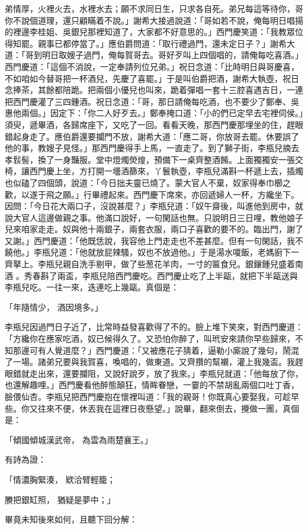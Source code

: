 \begin{showcontents}{}
弟情厚，火裡火去，水裡水去；願不求同日生，只求各自死。弟兄每這等待你，哥你不說個道理，還只顧瞞着不說。」謝希大接過說道：「哥如若不說，俺每明日唱揚的裡邊李桂姐、吳銀兒那裡知道了，大家都不好意思的。」西門慶笑道：「我教眾位得知罷。親事已都停當了。」應伯爵問道：「取行禮過門，還未定日子？」謝希大道：「哥到明日取嫂子過門，俺每賀哥去。哥好歹叫上四個唱的，請俺每吃喜酒。」西門慶道：「這個不消說，一定奉請列位兄弟。」祝日念道：「比時明日與哥慶喜，不如咱如今替哥把一杯酒兒，先慶了喜罷。」于是叫伯爵把酒，謝希大執壺，祝日念捧茶，其餘都陪跪。把兩個小優兒也叫來，跪着彈唱一套十三腔喜遇吉日，一連把西門慶灌了三四鍾酒。祝日念道：「哥，那日請俺每吃酒，也不要少了鄭奉、吳惠他兩個。」因定下：「你二人好歹去。」鄭奉掩口道：「小的們已定早去宅裡伺侯。」須臾，遞畢酒，各歸席座下，又吃了一回。看看天晚，那西門慶那埋坐的住，趕眼錯起身走了。應伯爵還要攔門不放，謝希大道：「應二哥，你放哥去罷。休要誤了他的事，教嫂子見怪。」那西門慶得手上馬，一直走了。到了獅子街，李瓶兒摘去孝䯼髻，換了一身豔服。堂中燈燭熒煌，預備下一桌齊整酒餚。上面獨獨安一張交椅，讓西門慶上坐，方打開一壜酒篩來，丫鬟執壺，李瓶兒滿斟一杯遞上去，插燭也似磕了四個頭，說道：「今日拙夫靈已燒了。蒙大官人不棄，奴家得奉巾櫛之歡，以遂于飛之願。」行畢禮起來。西門慶下席來，亦回遞婦人一杯，方纔坐下。因問：「今日花大兩口子，沒說甚麼？」李瓶兒道：「奴午齋後，叫進他到房中，就說大官人這邊做親之事。他滿口說好，一句閑話也無。只說明日三日哩，教他娘子兒來咱家走走。奴與他十兩銀子，兩套衣服，兩口子喜歡的要不的。臨出門，謝了又謝。」西門慶道：「他既恁說，我容他上門走走也不差甚麼。但有一句閑話，我不饒他。」李瓶兒道：「他就放屁辣騷，奴也不放過他。」于是湯水嗄飯，老媽廚下一齊拏上。李瓶兒親自洗手剔甲，做了些葱花羊肉，一寸的匾食兒。銀鑲鍾兒盛着南酒 。秀春斟了兩盃，李瓶兒陪西門慶吃。西門慶止吃了上半甌，就把下半甌送與李瓶兒吃。一往一來，迭連吃上幾甌。真個是：

「年隨情少，  酒因境多。」

李瓶兒因過門日子近了，比常時益發喜歡得了不的。臉上堆下笑來，對西門慶道：「方纔你在應家吃酒，奴已候得久了。又恐怕你醉了，叫玳安來請你早些歸來，不知那邊可有人覺道麼？」西門慶道：「又被應花子猜着，逼勒小廝說了幾句，鬧混了一場。諸弟兄要與我賀喜，喚唱的，做東道。又齊攢的幫襯，灌上我幾盃。我趕眼錯就走出來，還要攔阻，又說好說歹，放了我來。」李瓶兒就道：「他每放了你，也還解趣哩。」西門慶看他醉態顛狂，情眸眷戀，一霎的不禁胡亂兩個口吐丁香，臉偎仙杏。李瓶兒把西門慶抱在懷裡叫道：「我的親哥！你既真心要娶我，可趁早些。你又往來不便，休丟我在這裡日夜懸望。」說畢，翻來倒去，攪做一團，真個是：

「傾國傾城漢武帝，  為雲為雨楚襄王。」

有詩為證：

「情濃胸緊湊，  欵洽臂輕籠；

賸把銀缸照，  猶疑是夢中；」

畢竟未知後來如何，且聽下回分解：




\end{showcontents}
